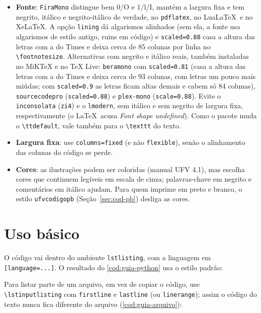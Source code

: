\begin{itemize}
  \item \textbf{Fonte}: \texttt{FiraMono} distingue bem 0/O e 1/l/I, mantém a largura fixa e
        tem negrito, itálico e negrito-itálico de verdade, no \texttt{pdflatex}, no
        Lua\LaTeX\ e no Xe\LaTeX. A opção \texttt{lining} dá algarismos alinhados (sem ela, a
        fonte usa algarismos de estilo antigo, ruins em código) e \texttt{scaled=0.88} casa a
        altura das letras com a do Times e deixa cerca de 85 colunas por linha no
        \texttt{\textbackslash footnotesize}. Alternativas com negrito e itálico reais, também
        instaladas no MiKTeX e no TeX Live: \texttt{beramono} com \texttt{scaled=0.81} (casa a
        altura das letras com a do Times e deixa cerca de 93 colunas, com letras um pouco mais
        miúdas; com \texttt{scaled=0.9} as letras ficam altas demais e cabem só 84 colunas),
        \texttt{sourcecodepro} (\texttt{scaled=0.88}) e \texttt{plex-mono}
        (\texttt{scale=0.88}). Evite o \texttt{inconsolata} (\texttt{zi4}) e o
        \texttt{lmodern}, sem itálico e sem negrito de largura fixa, respectivamente (o \LaTeX\
        acusa \emph{Font shape undefined}). Como o pacote muda o
        \texttt{\textbackslash ttdefault}, vale também para o \texttt{\textbackslash texttt}
        do texto.
  \item \textbf{Largura fixa}: use \texttt{columns=fixed} (e não \texttt{flexible}), senão o
        alinhamento das colunas do código se perde.
  \item \textbf{Cores}: as ilustrações podem ser coloridas (manual UFV 4.1), mas escolha
        cores que continuem legíveis em escala de cinza; palavras-chave em negrito e
        comentários em itálico ajudam. Para quem imprime em preto e branco, o estilo
        \texttt{ufvcodigopb} (Seção~\ref{sec:cod-pb}) desliga as cores.
\end{itemize}

\section{Uso básico}

O código vai dentro do ambiente \texttt{lstlisting}, com a linguagem em
\texttt{[language=...]}. O resultado do \autoref{cod:guia-python} usa o estilo padrão:


Para listar parte de um arquivo, em vez de copiar o código, use \texttt{\textbackslash lstinputlisting}
com \texttt{firstline} e \texttt{lastline} (ou \texttt{linerange}); assim o código do texto
nunca fica diferente do arquivo (\autoref{cod:guia-arquivo}):

